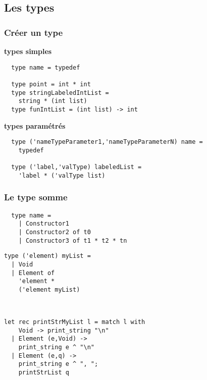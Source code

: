 \subsection{Les types} %
\begin{frame}[fragile]
	\frametitle{Créer un type}
	\textbf{types simples}
	\begin{lstlisting}
  type name = typedef

  type point = int * int
  type stringLabeledIntList = 
    string * (int list)
  type funIntList = (int list) -> int
	\end{lstlisting}
	\textbf{types paramétrés}
	\lstset{basicstyle=\scriptsize}
	\begin{lstlisting}
  type ('nameTypeParameter1,'nameTypeParameterN) name = 
    typedef
    
  type ('label,'valType) labeledList =
    'label * ('valType list) 
	\end{lstlisting}
\end{frame}

\begin{frame}[fragile]
	\frametitle{Le type somme}
	\begin{lstlisting}
  type name =
    | Constructor1 
    | Constructor2 of t0 
    | Constructor3 of t1 * t2 * tn 
	\end{lstlisting}
	
	\begin{center}
		\begin{minipage}{4.3cm}
			\lstset{basicstyle=\scriptsize}
			\begin{lstlisting}
type ('element) myList =
  | Void
  | Element of 
    'element * 
    ('element myList)
			\end{lstlisting}
		\end{minipage}\\
		\begin{minipage}{7.3cm}
			\lstset{basicstyle=\scriptsize}
			\begin{lstlisting}
let rec printStrMyList l = match l with
    Void -> print_string "\n"
  | Element (e,Void) -> 
    print_string e ^ "\n"
  | Element (e,q) -> 
    print_string e ^ ", ";
    printStrList q
			\end{lstlisting}
		\end{minipage}
	\end{center}
\end{frame}

